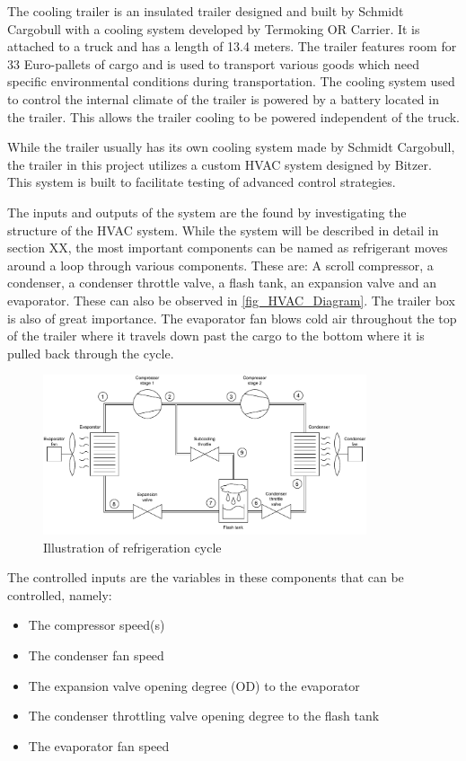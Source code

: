 The cooling trailer is an insulated trailer designed and built by Schmidt Cargobull with a cooling system developed by Termoking OR Carrier. It is attached to a truck and has a length of 13.4 meters. The trailer features room for 33 Euro-pallets of cargo and is used to transport various goods which need specific environmental conditions during transportation. The cooling system used to control the internal climate of the trailer is powered by a battery located in the trailer. This allows the trailer cooling to be powered independent of the truck.

While the trailer usually has its own cooling system made by Schmidt Cargobull, the trailer in this project utilizes a custom HVAC system designed by Bitzer. This system is built to facilitate testing of advanced control strategies.

The inputs and outputs of the system are the found by investigating the structure of the HVAC system. While the system will be described in detail in section XX, the most important components can be named as refrigerant moves around a loop through various components. These are: A scroll compressor, a condenser, a condenser throttle valve, a flash tank, an expansion valve and an evaporator. These can also be observed in \cref{fig_HVAC_Diagram}. The trailer box is also of great importance. 
The evaporator fan blows cold air throughout the top of the trailer where it travels down past the cargo to the bottom where it is pulled back through the cycle.

\begin{figure}[h!]
	\centering
	\includegraphics[width=0.85\textwidth]{Graphics/HVAC_Diagram_Fans.pdf}
	\caption{Illustration of refrigeration cycle}
	\label{fig:HVAC_Diagram}
\end{figure}

The controlled inputs are the variables in these components that can be controlled, namely:

\begin{itemize}
	\item The compressor speed(s)
	\item The condenser fan speed
	\item The expansion valve opening degree (OD) to the evaporator
	\item The condenser throttling valve opening degree to the flash tank
	\item The evaporator fan speed
\end{itemize}

